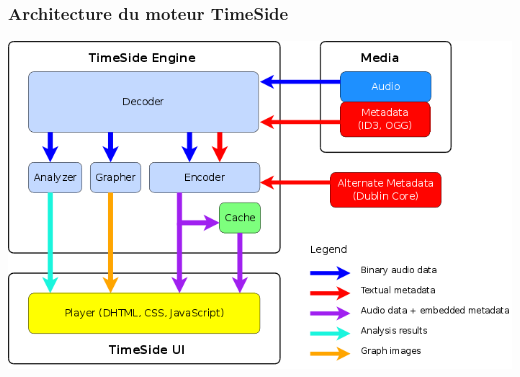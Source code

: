 \documentclass[10pt, final, hyperref, table]{beamer}
\begin{document}
\begin{frame}
  \frametitle{Architecture du moteur TimeSide}
  \begin{center}
    \includegraphics[width=\textwidth]{img/timeside_schema.png}
  \end{center}
\end{frame}
\end{document}
